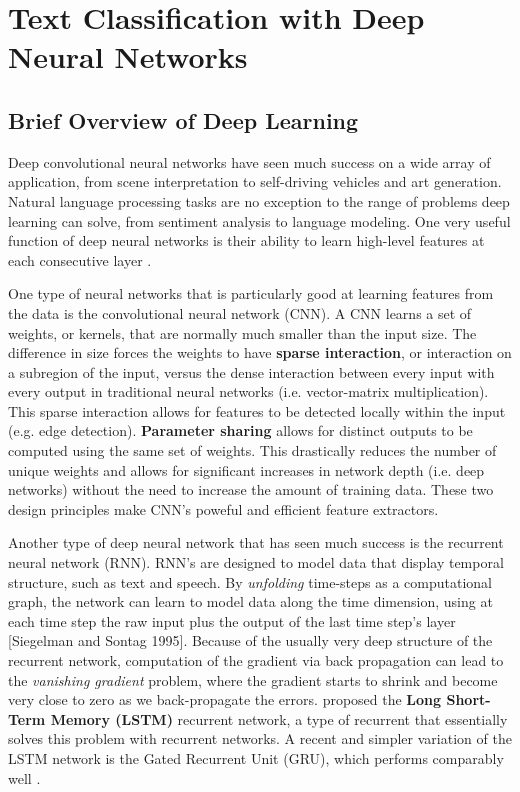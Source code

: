 
\chapter{Text Classification with Deep Neural Networks}\label{TXT-CLASS}

\section{Brief Overview of Deep Learning}
Deep convolutional neural networks have seen much success on a wide
array of application, from scene interpretation to self-driving vehicles and art generation.
Natural language processing tasks are no exception to the range of problems
deep learning can solve, from sentiment analysis to language modeling. One very useful function of deep neural networks
is their ability to learn high-level features at each consecutive layer \cite{le2013building}.

One type of neural networks that is particularly good at learning features from the data is the convolutional neural network (CNN)\cite{lecun1989backpropagation}\cite{oquab2014learning}\cite{dosovitskiy2014discriminative}.
A CNN learns a set of weights, or kernels, that are normally much smaller than the input size.
The difference in size forces the weights to have \textbf{sparse interaction}, or interaction on a subregion of the input, versus the dense interaction
between every input with every output in traditional neural networks (i.e. vector-matrix multiplication). This sparse interaction
allows for features to be detected locally within the input (e.g. edge detection).
\textbf{Parameter sharing} allows for distinct outputs to be computed using the same set of weights. This drastically reduces
the number of unique weights and allows for significant increases in network depth (i.e. deep networks) without the need
to increase the amount of training data.
These two design principles make CNN's poweful and efficient feature extractors.

Another type of deep neural network that has seen much success is the recurrent neural network (RNN). RNN's are designed to model data that display temporal structure, such as text and speech. By \textit{unfolding}
time-steps as a computational graph, the network can learn to model data along the time dimension, using at each time step the
raw input plus the output of the last time step's layer [Siegelman and Sontag 1995]. Because of the usually very deep structure of
the recurrent network, computation of the gradient via back propagation can lead to the \textit{vanishing gradient} problem, where the gradient
starts to shrink and become very close to zero as we back-propagate the errors. \cite{hochreiter1997long} proposed
the \textbf{Long Short-Term Memory (LSTM)} recurrent network, a type of recurrent that essentially solves this problem with recurrent networks.
A recent and simpler variation of the LSTM network is the Gated Recurrent Unit (GRU), which performs comparably well \cite{chung2014empirical}.



